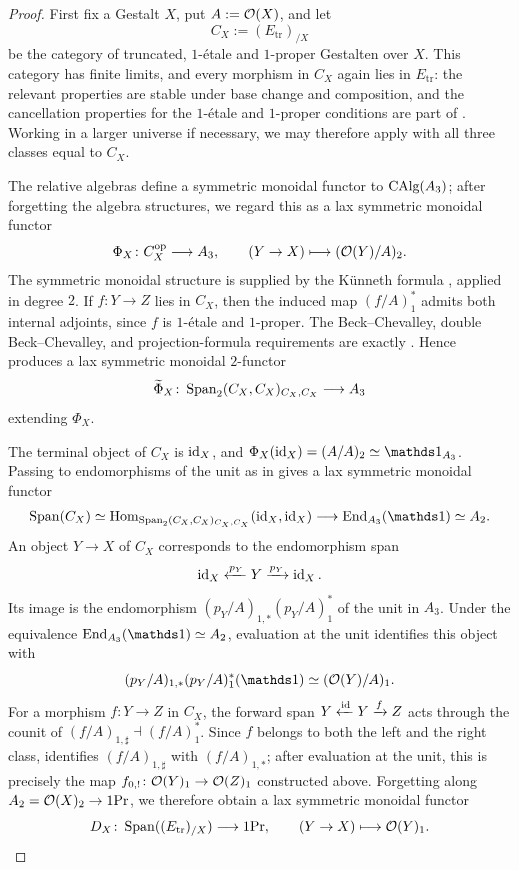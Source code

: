\documentclass[11pt]{book}
\begin{document}
	\begin{proof}
		First fix a Gestalt $X$, put $A:=\mathcal{O}(X)$, and let
		\[
			C_X:=(E_{\mathrm{tr}})_{/X}
		\]
		be the category of truncated, $1$-\'etale and $1$-proper Gestalten over $X$. This category has finite limits, and every morphism in $C_X$ again lies in $E_{\mathrm{tr}}$: the relevant properties are stable under base change and composition, and the cancellation properties for the $1$-\'etale and $1$-proper conditions are part of . Working in a larger universe if necessary, we may therefore apply  with all three classes equal to $C_X$.

		The relative algebras define a symmetric monoidal functor to ${\textup{CAlg}}(A_3)$; after forgetting the algebra structures, we regard this as a lax symmetric monoidal functor
		\[
			\Phi_X\colon C_X^{\textup{op}}\longrightarrow A_3,
			\qquad
			(Y\to X)\longmapsto (\mathcal{O}(Y)/A)_2.
		\]
		The symmetric monoidal structure is supplied by the Künneth formula , applied in degree $2$. If $f\colon Y\to Z$ lies in $C_X$, then the induced map $(f/A)^*_1$ admits both internal adjoints, since $f$ is $1$-\'etale and $1$-proper. The Beck--Chevalley, double Beck--Chevalley, and projection-formula requirements are exactly . Hence  produces a lax symmetric monoidal $2$-functor
		\[
			\widetilde\Phi_X\colon
			\operatorname{Span}_2(C_X,C_X)_{C_X,C_X}\longrightarrow A_3
		\]
		extending $\Phi_X$.

		The terminal object of $C_X$ is $\operatorname{id}_X$, and $\Phi_X(\id_X)=(A/A)_2\simeq\unit_{A_3}$. Passing to endomorphisms of the unit as in  gives a lax symmetric monoidal functor
		\[
			\Span(C_X)
			\simeq
			\Hom_{\SpanTwoP{C_X}{C_X}{C_X}{C_X}}(\id_X,\id_X)
			\longrightarrow
			\End_{A_3}(\unit)
			\simeq A_2.
		\]
		An object $Y\to X$ of $C_X$ corresponds to the endomorphism span
		\[
			\operatorname{id}_X\xleftarrow{p_Y}Y\xrightarrow{p_Y}\operatorname{id}_X.
		\]
		Its image is the endomorphism $(p_Y/A)_{1,*}(p_Y/A)^*_1$ of the unit in $A_3$. Under the equivalence $\End_{A_3}(\unit)\simeq A_2$, evaluation at the unit identifies this object with
		\[
			(p_Y/A)_{1,*}(p_Y/A)^*_1(\unit)
			\simeq(\Oo(Y)/A)_1.
		\]
		For a morphism $f\colon Y\to Z$ in $C_X$, the forward span $Y\xleftarrow{\operatorname{id}}Y\xrightarrow{f}Z$ acts through the counit of $(f/A)_{1,\sharp}\dashv(f/A)^*_1$. Since $f$ belongs to both the left and the right class,  identifies $(f/A)_{1,\sharp}$ with $(f/A)_{1,*}$; after evaluation at the unit, this is precisely the map $f_{0,!}\colon\mathcal{O}(Y)_1\to\mathcal{O}(Z)_1$ constructed above. Forgetting along $A_2=\mathcal{O}(X)_2\to1\textup{Pr}$, we therefore obtain a lax symmetric monoidal functor
		\[
			D_X\colon\operatorname{Span}((E_{\mathrm{tr}})_{/X})\longrightarrow1\textup{Pr},
			\qquad
			(Y\to X)\longmapsto\mathcal{O}(Y)_1.
		\]


\end{proof}
\end{document}

